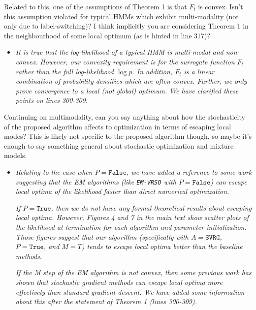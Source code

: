 \documentclass[11pt]{article}
\begin{document}
Related to this, one of the assumptions of Theorem 1 is that $F_t$ is convex. Isn't this assumption violated for typical HMMs which exhibit multi-modality (not only due to label-switching)? I think implicitly you are considering Theorem 1 in the neighbourhood of some local optimum (as is hinted in line 317)? 

\begin{itemize}
    \item \textit{It is true that the log-likelihood of a typical HMM is multi-modal and non-convex. However, our convexity requirement is for the surrogate function $F_t$ rather than the full log-likelihood $\log p$. In addition, $F_t$ is a linear combination of probability densities which are often convex. Further, we only prove convergence to a local (not global) optimum. We have clarified these points on lines 300-309.}
\end{itemize}

Continuing on multimodality, can you say anything about how the stochasticity of the proposed algorithm affects to optimization in terms of escaping local modes? This is likely not specific to the proposed algorithm though, so maybe it's enough to say something general about stochastic optimization and mixture models.

\begin{itemize}
    \item \textit{Relating to the case when $P = \texttt{False}$, we have added a reference to some work suggesting that the EM algorithms (like \texttt{EM-VRSO} with $P = \texttt{False}$) can escape local optima of the likelihood faster than direct numerical optimization.} 

    \textit{If $P = \texttt{True}$, then we do not have any formal theoretical results about escaping local optima. However, Figures 4 and 7 in the main text show scatter plots of the likelihood at termination for each algorithm and parameter initialization. Those figures suggest that our algorithm (specifically with $A = \texttt{SVRG}$, $P = \texttt{True}$, and $M=T$) tends to escape local optima better than the baseline methods.}
    
    \textit{If the M step of the EM algorithm is not convex, then some previous work has shown that stochastic gradient methods can escape local optima more effectively than standard gradient descent. We have added some information about this after the statement of Theorem 1 (lines 300-309).}
\end{itemize}
\end{document}
